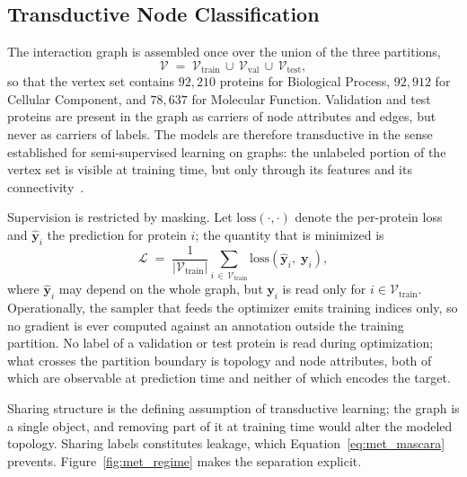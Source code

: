 \documentclass[Ingles]{ic-tese-v3}
\begin{document}
\subsection{Transductive Node Classification}
\label{sec:met_transdutivo}

The interaction graph is assembled once over the union of the three partitions,
\begin{equation}
  \mathcal{V} \;=\; \mathcal{V}_{\text{train}} \,\cup\, \mathcal{V}_{\text{val}} \,\cup\, \mathcal{V}_{\text{test}},
  \label{eq:met_universo}
\end{equation}
\noindent so that the vertex set contains $92{,}210$ proteins for Biological Process, $92{,}912$ for Cellular
Component, and $78{,}637$ for Molecular Function. Validation and test proteins are present in the
graph as carriers of node attributes and edges, but never as carriers of labels. The
models are therefore transductive in the sense established for semi-supervised learning on graphs:
the unlabeled portion of the vertex set is visible at training time, but only through its features
and its connectivity~\cite{yang2016revisiting}.

Supervision is restricted by masking. Let $\mathrm{loss}(\cdot,\cdot)$ denote the per-protein loss and
$\hat{\mathbf{y}}_i$ the prediction for protein $i$; the quantity that is minimized is
\begin{equation}
  \mathcal{L} \;=\; \frac{1}{|\mathcal{V}_{\text{train}}|}
  \sum_{i \,\in\, \mathcal{V}_{\text{train}}} \mathrm{loss}\!\left(\hat{\mathbf{y}}_i,\; \mathbf{y}_i\right),
  \label{eq:met_mascara}
\end{equation}
\noindent where $\hat{\mathbf{y}}_i$ may depend on the whole graph, but $\mathbf{y}_i$ is read only for
$i \in \mathcal{V}_{\text{train}}$. Operationally, the sampler that feeds the optimizer emits
training indices only, so no gradient is ever computed against an annotation outside the training
partition. No label of a validation or test protein is read during optimization; what crosses the
partition boundary is topology and node attributes, both of which are observable at prediction time
and neither of which encodes the target.

Sharing structure is the defining assumption of transductive learning; the graph is a single object,
and removing part of it at training time would alter the modeled topology. Sharing labels constitutes
leakage, which Equation~\eqref{eq:met_mascara} prevents. Figure~\ref{fig:met_regime} makes
the separation explicit.
\end{document}
